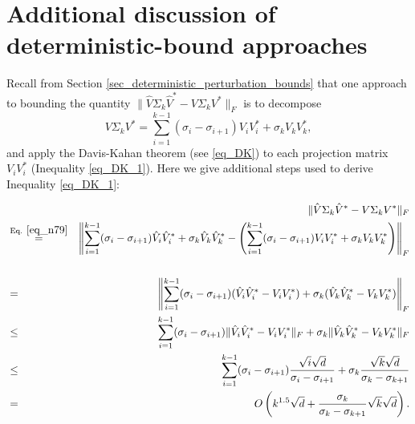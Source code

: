 \documentclass[11pt,letterpaper]{article}
\begin{document}
\section{Additional discussion of deterministic-bound approaches}\label{sec_challenges}




%
Recall from Section \ref{sec_deterministic_perturbation_bounds} that one approach to bounding the quantity $\|\hat{V} \Sigma_k \hat{V}^\ast - V \Sigma_k V^\ast\|_F$ is to decompose %
%
\begin{equation}\label{eq_n79}
V \Sigma_k V^\ast = \sum_{i=1}^{k-1} (\sigma_i- \sigma_{i+1})V_i V_i^\ast + \sigma_k V_k V_k^\ast,
\end{equation}
%
and apply the Davis-Kahan theorem \cite{davis1970rotation} (see \eqref{eq_DK}) to each projection matrix $V_i V_i^\ast$ (Inequality \eqref{eq_DK_1}).
%
Here we give additional steps used to derive Inequality \eqref{eq_DK_1}:


%
\begin{eqnarray}
    & & \!\!\!\!\!\!\!\!\!\!\!\!\!\!\! \!\!\!\!\!\! \!\!\!\!\!\!\!\!\! \!\!\!\!\!\!\!\!\! \|\hat{V} \Sigma_k \hat{V}^\ast - V \Sigma_k V^\ast\|_F\nonumber\\
    &\stackrel{\textrm{Eq. } \eqref{eq_n79}}{=}& \left\|\sum_{i=1}^{k-1} (\sigma_i- \sigma_{i+1})\hat{V}_i \hat{V}_i^\ast + \sigma_k \hat{V}_k \hat{V}_k^\ast - \left(\sum_{i=1}^{k-1} (\sigma_i- \sigma_{i+1})V_i V_i^\ast + \sigma_k V_k V_k^\ast\right) \right\|_F \nonumber\\  \nonumber\\
&=&    \left\|\sum_{i=1}^{k-1} (\sigma_i - \sigma_{i+1}) (\hat{V}_i \hat{V}_i^\ast - V_i V_i^\ast) + \sigma_k (\hat{V}_k \hat{V}_k^\ast - V_k V_k^\ast) \right\|_F \nonumber\\
    &\leq & \sum_{i=1}^{k-1} (\sigma_i - \sigma_{i+1}) \|\hat{V}_i \hat{V}_i^\ast - V_i V_i^\ast\|_F + \sigma_k \|\hat{V}_k \hat{V}_k^\ast - V_k V_k^\ast\|_F \nonumber\\
    & \leq & \sum_{i=1}^{k-1} (\sigma_i - \sigma_{i+1}) \frac{\sqrt{i} \sqrt{d}}{\sigma_i - \sigma_{i+1}} + \sigma_k   \frac{\sqrt{k} \sqrt{d}}{\sigma_k - \sigma_{k+1}} \nonumber\\
    & = & O\left(k^{1.5} \sqrt{d} + \frac{\sigma_k}{\sigma_k - \sigma_{k+1}} \sqrt{k} \sqrt{d}\right).  \nonumber
\end{eqnarray}
%
%
\end{document}
